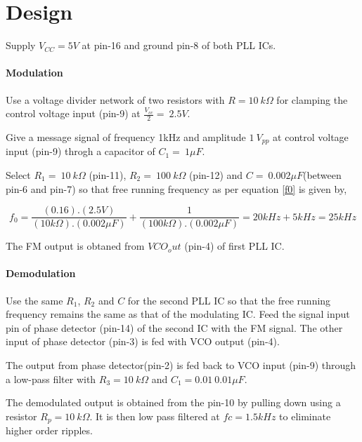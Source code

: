  
\section*{Design}

Supply $V_{CC}=5V$ at pin-16 and ground pin-8 of both  PLL ICs.

\paragraph{Modulation}


\noindent Use a voltage divider network of two resistors with $ R=10\ k\Omega$  for clamping the control voltage input (pin-9) at $\frac{V_{cc}}{2}=\ 2.5V$. 


\noindent Give a message signal of frequency 1kHz and amplitude  $1\ V_{pp}$ at control voltage input (pin-9) throgh a capacitor of $C_1=\ 1\mu F$.


\noindent Select $R_1=\ 10\ k\Omega$ (pin-11),   $R_2=\ 100\ k\Omega$ (pin-12) and $C=\  0.002 \mu F$(between pin-6 and pin-7) so that free running frequency as per equation \ref{f0} is given by,

\begin{equation}
f_0 =\frac{(0.16 ). (2.5V)}{(10k\Omega).(0.002\mu F)}+\frac{1}{(100k\Omega).(0.002\mu F)}=20 kHz+5 kHz=25 kHz
\end{equation}
 
\noindent The FM output is obtaned from $VCO_out$ (pin-4) of first PLL IC.

\paragraph{Demodulation}



\noindent Use the same $R_1$, $R_2$ and $C$ for the second PLL IC so that the free running frequency remains the same as that of the modulating IC. 
Feed the signal input pin of phase detector (pin-14) of the second IC with the FM signal. The other input of phase detector (pin-3) is fed with VCO output (pin-4).

\noindent The output from phase detector(pin-2)  is fed back to  VCO input (pin-9) through a low-pass filter with $R_3=10\ k\Omega$ and $C_1=0.01\ 0.01\mu F$. 

\noindent The demodulated output is obtained from the pin-10 by pulling down using a resistor $R_p=10 \ k\Omega$. It is then low pass filtered at $fc=1.5 kHz$ to eliminate higher order ripples.

